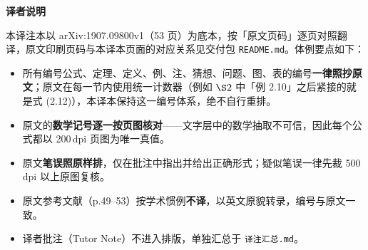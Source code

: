\vspace{0.8cm}
\begin{center}
{\large\bfseries 译者说明}
\end{center}

\noindent
本译注本以 arXiv:1907.09800v1（53 页）为底本，按「原文页码」逐页对照翻译，原文印刷页码与本译本页面的对应关系见交付包 \texttt{README.md}。体例要点如下：

\begin{itemize}[leftmargin=2em,itemsep=2pt]
\item 所有编号公式、定理、定义、例、注、猜想、问题、图、表的编号\textbf{一律照抄原文}；原文在每一节内使用统一计数器（例如 $\S2$ 中「例 2.10」之后紧接的就是式 (2.12)），本译本保持这一编号体系，绝不自行重排。
\item 原文的\textbf{数学记号逐一按页图核对}——文字层中的数学抽取不可信，因此每个公式都以 200\,dpi 页图为唯一真值。
\item 原文\textbf{笔误照原样排}，仅在批注中指出并给出正确形式；疑似笔误一律先裁 500\,dpi 以上原图复核。
\item 原文参考文献（p.49--53）按学术惯例\textbf{不译}，以英文原貌转录，编号与原文一致。
\item 译者批注（Tutor Note）不进入排版，单独汇总于 \texttt{译注汇总.md}。
\end{itemize}

\clearpage
\tableofcontents
\clearpage
